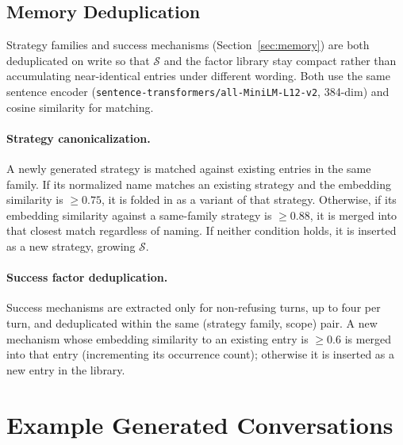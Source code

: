 \subsection{Memory Deduplication}
\label{app:memory_dedup}

Strategy families and success mechanisms (Section~\ref{sec:memory}) are both deduplicated on write so that $\mathcal{S}$ and the factor library stay compact rather than accumulating near-identical entries under different wording.
Both use the same sentence encoder (\texttt{sentence-transformers/all-MiniLM-L12-v2}, 384-dim) and cosine similarity for matching.

\paragraph{Strategy canonicalization.}
A newly generated strategy is matched against existing entries in the same family.
If its normalized name matches an existing strategy and the embedding similarity is $\ge 0.75$, it is folded in as a variant of that strategy.
Otherwise, if its embedding similarity against a same-family strategy is $\ge 0.88$, it is merged into that closest match regardless of naming.
If neither condition holds, it is inserted as a new strategy, growing $\mathcal{S}$.

\paragraph{Success factor deduplication.}
Success mechanisms are extracted only for non-refusing turns, up to four per turn, and deduplicated within the same (strategy family, scope) pair.
A new mechanism whose embedding similarity to an existing entry is $\ge 0.6$ is merged into that entry (incrementing its occurrence count); otherwise it is inserted as a new entry in the library.

\section{Example Generated Conversations}
\label{app:conversations}

